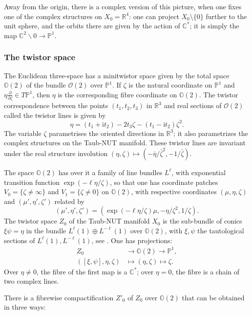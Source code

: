 \documentclass[12pt]{article}
\theoremstyle{definition}
\theoremstyle{remark}
\numberwithin{theorem}{section}
\renewcommand{\i}{\mathrm{i}}
\def\bR{{\mathbb {R}}}
\def\bC{{\mathbb {C}}}
\def\bP{{\mathbb {P}}}
\def\bO{{\mathbb {O}}}
\def\pO{{\mathcal O}}
\begin{document}
 
  Away from the origin, there is a complex version of this picture, when one fixes one of the complex structures on $X_0= \bR^4$: one can project $X_0\setminus\{0\}$ further to the unit sphere, and the orbits there are given by the action of $\bC^*$; it is simply the map 
  $\bC^2\backslash 0 \rightarrow \bP^1$.
  
  \subsubsection{The twistor space}\label{Sec:TwistorSpace}
    
  The Euclidean three-space has a minitwistor space given by the total space $\bO(2)$ of the bundle 
$\pO(2)$ over $\bP^1$. If $\zeta$ is the natural coordinate on $\bP^1$ and $\eta\frac{\partial}{\partial\zeta}\in T\mathbb{P}^1$, then $\eta$ is the corresponding fibre coordinate on $\bO(2).$  The twistor correspondence between the points $(t_1,t_2,t_3)$ in $\mathbb{R}^3$ and real sections of $\pO(2)$ called the twistor lines is given by 
$$\eta = (t_1+\i t_2) - 2  t_3\zeta - (t_1-\i t_2)\zeta^2.$$
The variable $\zeta$ parametrises the oriented directions in $\bR^3$; it also parametrizes the complex structures on the Taub-NUT manifold. These twistor  lines are invariant under the real structure involution $(\eta, \zeta)\mapsto (-\bar\eta/\bar\zeta^2,-1/\bar\zeta)$.


The space $\bO(2)$ has over it a family of line bundles $L^\ell$,  with exponential transition function $\exp(-\ell\eta/\zeta)$, so that one has coordinate patches ${V_0= \{\zeta\neq\infty\}}$ and   $V_1=  \{\zeta\neq 0\}$ on $\bO(2)$, with respective coordinates $(\mu, \eta,\zeta)$ and  $(\mu',\eta',\zeta')$ related by
$$(\mu', \eta',\zeta') = ( \exp(-\ell \eta/\zeta) \mu, -\eta/\zeta^2, 1/\zeta).$$ 
 The twistor space $Z_0$ of the Taub-NUT manifold $X_0$ is the sub-bundle of conics $\xi \psi=\eta$ in the bundle $L^\ell(1) \oplus L^{-\ell}(1)$ over $\bO(2)$, with $\xi, \psi$ the tautological sections of  $L^\ell(1),L^{-\ell}(1)$, see \cite{Hitchin79}. One has projections:
\begin{align} 
Z_0&\rightarrow \bO(2) \rightarrow \bP^1, \\
( [\xi,\psi], \eta,\zeta)&\mapsto (\eta,\zeta)\mapsto\nonumber \zeta.
\end{align}
Over $\eta\neq 0$, the fibre of the first map is a $\bC^*$; over $\eta=0$, the fibre is   a chain of two complex lines.

 There is a  fibrewise compactification $Z'_0$ of $Z_0$ over $\bO(2)$ that can be  obtained in three ways:
\end{document}
